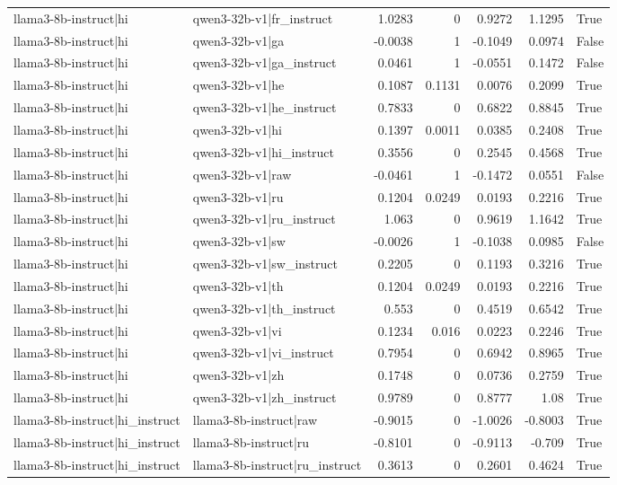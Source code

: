 \begin{table}
\begin{tabular}{l l r r r r l}
llama3-8b-instruct|hi & qwen3-32b-v1|fr_instruct & 1.0283 & 0 & 0.9272 & 1.1295 & True \\
llama3-8b-instruct|hi & qwen3-32b-v1|ga & -0.0038 & 1 & -0.1049 & 0.0974 & False \\
llama3-8b-instruct|hi & qwen3-32b-v1|ga_instruct & 0.0461 & 1 & -0.0551 & 0.1472 & False \\
llama3-8b-instruct|hi & qwen3-32b-v1|he & 0.1087 & 0.1131 & 0.0076 & 0.2099 & True \\
llama3-8b-instruct|hi & qwen3-32b-v1|he_instruct & 0.7833 & 0 & 0.6822 & 0.8845 & True \\
llama3-8b-instruct|hi & qwen3-32b-v1|hi & 0.1397 & 0.0011 & 0.0385 & 0.2408 & True \\
llama3-8b-instruct|hi & qwen3-32b-v1|hi_instruct & 0.3556 & 0 & 0.2545 & 0.4568 & True \\
llama3-8b-instruct|hi & qwen3-32b-v1|raw & -0.0461 & 1 & -0.1472 & 0.0551 & False \\
llama3-8b-instruct|hi & qwen3-32b-v1|ru & 0.1204 & 0.0249 & 0.0193 & 0.2216 & True \\
llama3-8b-instruct|hi & qwen3-32b-v1|ru_instruct & 1.063 & 0 & 0.9619 & 1.1642 & True \\
llama3-8b-instruct|hi & qwen3-32b-v1|sw & -0.0026 & 1 & -0.1038 & 0.0985 & False \\
llama3-8b-instruct|hi & qwen3-32b-v1|sw_instruct & 0.2205 & 0 & 0.1193 & 0.3216 & True \\
llama3-8b-instruct|hi & qwen3-32b-v1|th & 0.1204 & 0.0249 & 0.0193 & 0.2216 & True \\
llama3-8b-instruct|hi & qwen3-32b-v1|th_instruct & 0.553 & 0 & 0.4519 & 0.6542 & True \\
llama3-8b-instruct|hi & qwen3-32b-v1|vi & 0.1234 & 0.016 & 0.0223 & 0.2246 & True \\
llama3-8b-instruct|hi & qwen3-32b-v1|vi_instruct & 0.7954 & 0 & 0.6942 & 0.8965 & True \\
llama3-8b-instruct|hi & qwen3-32b-v1|zh & 0.1748 & 0 & 0.0736 & 0.2759 & True \\
llama3-8b-instruct|hi & qwen3-32b-v1|zh_instruct & 0.9789 & 0 & 0.8777 & 1.08 & True \\
llama3-8b-instruct|hi_instruct & llama3-8b-instruct|raw & -0.9015 & 0 & -1.0026 & -0.8003 & True \\
llama3-8b-instruct|hi_instruct & llama3-8b-instruct|ru & -0.8101 & 0 & -0.9113 & -0.709 & True \\
llama3-8b-instruct|hi_instruct & llama3-8b-instruct|ru_instruct & 0.3613 & 0 & 0.2601 & 0.4624 & True \\

\end{tabular}
\end{table}
